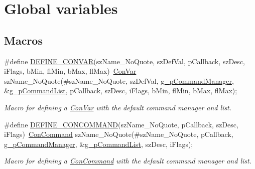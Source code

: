 \hypertarget{group___global_variables}{\section{Global variables}
\label{group___global_variables}
}
\subsection*{Macros}
\begin{DoxyCompactItemize}
\item 
\#define \hyperlink{group___global_variables_gaf9c6d8de2e7b3d11f070bb500d62edce}{D\-E\-F\-I\-N\-E\-\_\-\-C\-O\-N\-V\-A\-R}(sz\-Name\-\_\-\-No\-Quote, sz\-Def\-Val, p\-Callback, sz\-Desc, i\-Flags, b\-Min, fl\-Min, b\-Max, fl\-Max)~\hyperlink{class_con_var}{Con\-Var} sz\-Name\-\_\-\-No\-Quote(\#sz\-Name\-\_\-\-No\-Quote, sz\-Def\-Val, \hyperlink{group___global_variables_ga4d39defaa5d22f29bde4c75d590bd0fe}{g\-\_\-p\-Command\-Manager}, \&\hyperlink{group___global_variables_ga8389c826239a1bc627ae3b7f97a79fe4}{g\-\_\-p\-Command\-List}, p\-Callback, sz\-Desc, i\-Flags, b\-Min, fl\-Min, b\-Max, fl\-Max);
\begin{DoxyCompactList}\small\item\em Macro for defining a \hyperlink{class_con_var}{Con\-Var} with the default command manager and list. \end{DoxyCompactList}\item 
\#define \hyperlink{group___global_variables_ga5c65583f94cc62a481b1846c0e6e3344}{D\-E\-F\-I\-N\-E\-\_\-\-C\-O\-N\-C\-O\-M\-M\-A\-N\-D}(sz\-Name\-\_\-\-No\-Quote, p\-Callback, sz\-Desc, i\-Flags)~\hyperlink{class_con_command}{Con\-Command} sz\-Name\-\_\-\-No\-Quote(\#sz\-Name\-\_\-\-No\-Quote, p\-Callback, \hyperlink{group___global_variables_ga4d39defaa5d22f29bde4c75d590bd0fe}{g\-\_\-p\-Command\-Manager}, \&\hyperlink{group___global_variables_ga8389c826239a1bc627ae3b7f97a79fe4}{g\-\_\-p\-Command\-List}, sz\-Desc, i\-Flags);
\begin{DoxyCompactList}\small\item\em Macro for defining a \hyperlink{class_con_command}{Con\-Command} with the default command manager and list. \end{DoxyCompactList}\end{DoxyCompactItemize}
